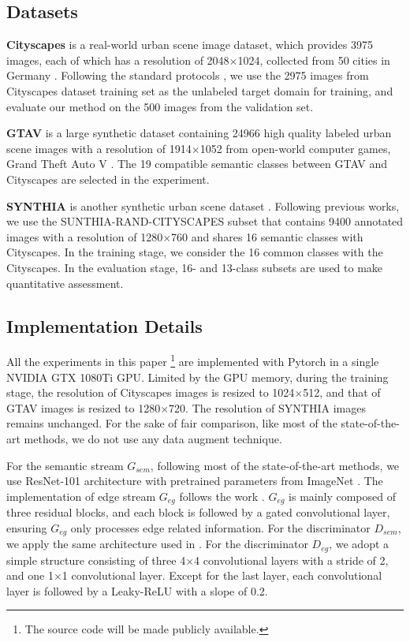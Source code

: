 \documentclass[sigconf]{acmart}
\begin{document}
\subsection{Datasets}
\par \textbf{Cityscapes} is a real-world urban scene image dataset, which provides 3975 images, each of which has a resolution of 2048$\times$1024, collected from 50 cities in Germany \cite{cordts2016cityscapes}. Following the standard protocols \cite{hoffman2016fcns,luo2019taking,vu2019advent}, we use the 2975 images from Cityscapes dataset training set as the unlabeled target domain for training, and evaluate our method on the 500 images from the validation set. 

\par \textbf{GTAV} is a large synthetic dataset containing 24966 high quality labeled urban scene images with a resolution of 1914$\times$1052 from open-world computer games, Grand Theft Auto V \cite{richter2016playing}. The 19 compatible semantic classes between GTAV and Cityscapes are selected in the experiment.

\par \textbf{SYNTHIA} is another synthetic urban scene dataset \cite{ros2016synthia}. Following previous works, we use the SUNTHIA-RAND-CITYSCAPES subset that contains 9400 annotated images with a resolution of 1280$\times$760 and shares 16 semantic classes with Cityscapes. In the training stage, we consider the 16 common classes with the Cityscapes. In the evaluation stage, 16- and 13-class subsets are used to make quantitative assessment. 

\subsection{Implementation Details}
\par All the experiments in this paper \footnote{The source code will be made publicly
available.} are implemented with Pytorch in a single NVIDIA GTX 1080Ti GPU. Limited by the GPU memory, during the training stage, the resolution of Cityscapes images is resized to 1024$\times$512, and that of GTAV images is resized to 1280$\times$720. The resolution of SYNTHIA images remains unchanged. For the sake of fair comparison, like most of the state-of-the-art methods, we do not use any data augment technique. 

\par For the semantic stream $G_{sem}$, following most of the state-of-the-art methods, we use ResNet-101 architecture \cite{he2016deep} with pretrained parameters from ImageNet \cite{deng2009imagenet}. The implementation of edge stream $G_{eg}$ follows the work \cite{takikawa2019gated}. $G_{eg}$ is mainly composed of three residual blocks, and each block is followed by a gated convolutional layer, ensuring $G_{eg}$ only processes edge related information. For the discriminator $D_{sem}$, we apply the same architecture used in \cite{vu2019advent}. For the discriminator $D_{eg}$, we adopt a simple structure consisting of three 4$\times$4 convolutional layers with a stride of 2, and one 1$\times$1 convolutional layer. Except for the last layer, each convolutional layer is followed by a Leaky-ReLU with a slope of 0.2.
\end{document}
